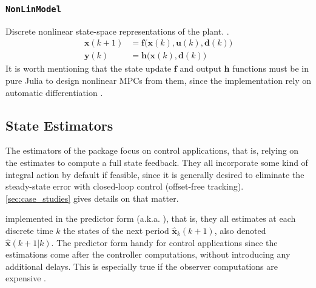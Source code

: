 \subsubsection{\textnormal{\texttt{NonLinModel}}}

Discrete nonlinear state-space representations of the plant. . 
\begin{subequations}
\begin{align}
    \mathbf{x}(k+1) &= \mathbf{f}\big(\mathbf{x}(k), \mathbf{u}(k), \mathbf{d}(k)\big) \\
    \mathbf{y}(k)   &= \mathbf{h}\big( \mathbf{x}(k), \mathbf{d}(k) \big)
\end{align}
\end{subequations}
It is worth mentioning that the state update $\mathbf{f}$ and output $\mathbf{h}$ functions must be in pure Julia to design nonlinear MPCs from them, since the implementation rely on  automatic differentiation .

\subsection{State Estimators}

The estimators of the package focus on control applications, that is, relying on the estimates to compute a full state feedback. They all incorporate some kind of integral action by default if feasible, since it is generally desired to eliminate the steady-state error with closed-loop control (offset-free tracking). \cref{sec:case_studies} gives details on that matter.

 implemented in the predictor form (a.k.a. ), that is, they all estimates at each discrete time $k$ the states of the next period $\mathbf{\hat{x}}_k(k+1)$, also denoted $\mathbf{\hat{x}}(k+1|k)$.  The predictor form  handy for control applications since the estimations come after the controller computations, without introducing any additional delays. This is especially true if the observer computations are expensive . 

